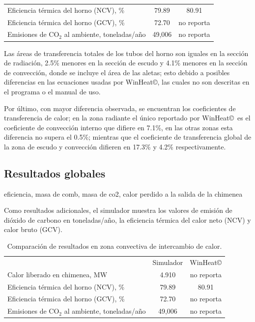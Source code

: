 \begin{table}[H]
\begin{center}
\begin{tabular}{l|c|c}
Eficiencia térmica del horno (NCV), \%	& 79.89  & 80.91 \\
Eficiencia térmica del horno (GCV), \%	& 72.70  & no reporta \\
Emisiones de CO$_2$ al ambiente, toneladas/año	& 49,006  & no reporta \\
\end{tabular} \end{center} \end{table}
\par Las áreas de transferencia totales de los tubos del horno son iguales en la sección de radiación, 2.5\% menores en la sección de escudo y 4.1\% menores en la sección de convección, donde se incluye el área de las aletas; esto debido a posibles diferencias en las ecuaciones usadas por WinHeat\copyright, las cuales no son descritas en el programa o el manual de uso.
\par Por último, con mayor diferencia observada, se encuentran los coeficientes de transferencia de calor; en la zona radiante el único reportado por WinHeat\copyright \ es el coeficiente de convección interno que difiere en 7.1\%, en las otras zonas esta diferencia no supera el 0.5\%; mientras que el coeficiente de transferencia global de la zona de escudo y convección difieren en 17.3\% y 4.2\% respectivamente.

\subsection{Resultados globales}
eficiencia, masa de comb, masa de co2, calor perdido a la salida de la chimenea
\par Como resultados adicionales, el simulador muestra los valores de emisión de dióxido de carbono en toneladas/año, la eficiencia térmica del calor neto (NCV) y calor bruto (GCV)\cite{bib:api560}.
\begin{table}[H]\begin{center}
\caption[Resultados en zona convectiva de intercambio de calor]{Comparación de resultados en zona convectiva de intercambio de calor.}
\label{tbl:compara-global}
\begin{tabular}{l|c|c}
	& Simulador & WinHeat\copyright \\
Calor liberado en chimenea, MW	    & 4.910 & no reporta \\

Eficiencia térmica del horno (NCV), \%	& 79.89  & 80.91 \\
Eficiencia térmica del horno (GCV), \%	& 72.70  & no reporta \\
Emisiones de CO$_2$ al ambiente, toneladas/año	& 49,006  & no reporta \\
\end{tabular} \end{center} \end{table}

